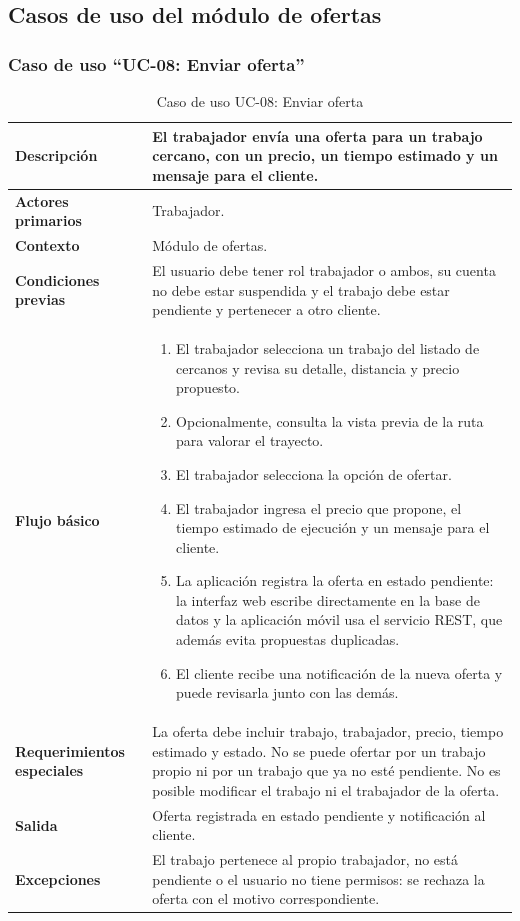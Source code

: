 \documentclass[doc,12pt,a4paper]{apa7}
\begin{document}
\subsection{Casos de uso del módulo de ofertas}

\subsubsection{Caso de uso ``UC-08: Enviar oferta''}

\begin{longtable}{|P{3.3cm}|L{11.2cm}|}
\caption{Caso de uso UC-08: Enviar oferta}\\
\hline
\textbf{Descripción} & El trabajador envía una oferta para un trabajo cercano, con un precio, un tiempo estimado y un mensaje para el cliente. \\ \hline
\textbf{Actores primarios} & Trabajador. \\ \hline
\textbf{Contexto} & Módulo de ofertas. \\ \hline
\textbf{Condiciones previas} & El usuario debe tener rol trabajador o ambos, su cuenta no debe estar suspendida y el trabajo debe estar pendiente y pertenecer a otro cliente. \\ \hline
\textbf{Flujo básico} &
\begin{enumerate}
    \item El trabajador selecciona un trabajo del listado de cercanos y revisa su detalle, distancia y precio propuesto.
    \item Opcionalmente, consulta la vista previa de la ruta para valorar el trayecto.
    \item El trabajador selecciona la opción de ofertar.
    \item El trabajador ingresa el precio que propone, el tiempo estimado de ejecución y un mensaje para el cliente.
    \item La aplicación registra la oferta en estado pendiente: la interfaz web escribe directamente en la base de datos y la aplicación móvil usa el servicio REST, que además evita propuestas duplicadas.
    \item El cliente recibe una notificación de la nueva oferta y puede revisarla junto con las demás.
\end{enumerate} \\ \hline
\textbf{Requerimientos especiales} & La oferta debe incluir trabajo, trabajador, precio, tiempo estimado y estado. No se puede ofertar por un trabajo propio ni por un trabajo que ya no esté pendiente. No es posible modificar el trabajo ni el trabajador de la oferta. \\ \hline
\textbf{Salida} & Oferta registrada en estado pendiente y notificación al cliente. \\ \hline
\textbf{Excepciones} & El trabajo pertenece al propio trabajador, no está pendiente o el usuario no tiene permisos: se rechaza la oferta con el motivo correspondiente. \\ \hline
\end{longtable}
\end{document}
